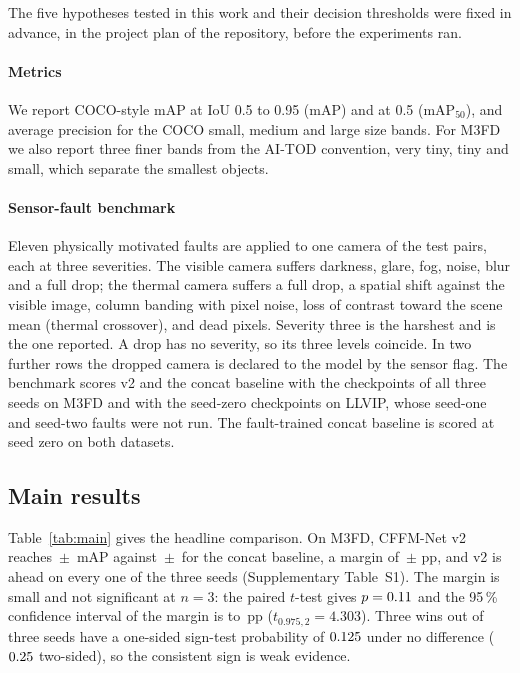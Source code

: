 The five hypotheses tested in this work and their decision thresholds were fixed in advance, in the project plan of the repository, before the experiments ran.

\paragraph{Metrics}
We report COCO-style mAP at IoU 0.5 to 0.95 (mAP) and at 0.5 (mAP$_{50}$), and average precision for the COCO small, medium and large size bands. For M3FD we also report three finer bands from the AI-TOD convention, very tiny, tiny and small, which separate the smallest objects.

\paragraph{Sensor-fault benchmark}
Eleven physically motivated faults are applied to one camera of the test pairs, each at three severities. The visible camera suffers darkness, glare, fog, noise, blur and a full drop; the thermal camera suffers a full drop, a spatial shift against the visible image, column banding with pixel noise, loss of contrast toward the scene mean (thermal crossover), and dead pixels. Severity three is the harshest and is the one reported. A drop has no severity, so its three levels coincide. In two further rows the dropped camera is declared to the model by the sensor flag. The benchmark scores v2 and the concat baseline with the checkpoints of all three seeds on M3FD and with the seed-zero checkpoints on LLVIP, whose seed-one and seed-two faults were not run. The fault-trained concat baseline is scored at seed zero on both datasets.

\subsection{Main results}
\label{sec:main}
Table~\ref{tab:main} gives the headline comparison. On M3FD, CFFM-Net v2 reaches \resMfdCffmVtwoMeanMap{}\,$\pm$\,\resMfdCffmVtwoStdMap{} mAP against \resMfdConcatMdMeanMap{}\,$\pm$\,\resMfdConcatMdStdMap{} for the concat baseline, a margin of \marMfdVtwoVsConcatMdMeanMap{}\,$\pm$\,\marMfdVtwoVsConcatMdStdMap{}\,pp, and v2 is ahead on every one of the three seeds (Supplementary Table~S1). The margin is small and not significant at $n=3$: the paired $t$-test gives $p=0.11{}$ and the 95\,\% confidence interval of the margin is \sigMfdCiLow{} to \sigMfdCiHigh{}\,pp ($t_{0.975,2}=4.303$). Three wins out of three seeds have a one-sided sign-test probability of $0.125{}$ under no difference ($0.25{}$ two-sided), so the consistent sign is weak evidence.

